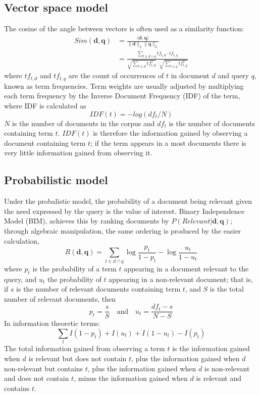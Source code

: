 \subsection{Vector space model}
The cosine of the angle between vectors is often used as a similarity function: 
\begin{align}
Sim(\mathbf{d}, \mathbf{q}) &= \frac{\langle\mathbf{d}, \mathbf{q} \rangle}{\|\mathbf{d}\|_2\|\mathbf{q}\|_2}\\
&= \frac{\sum_{t \in d \cup q} tf_{t, d}\cdot tf_{t, q}}{\sqrt{\sum_{t \in d} tf_{t, d}^2}\cdot\sqrt{\sum_{t \in q} tf_{t, q}^2} }
\end{align}
where $tf_{t, d}$ and $tf_{t, q}$ are the count of occurrences of $t$ in document $d$ and query $q$, known as term frequencies.  Term weights are usually adjusted by multiplying each term frequency by the Inverse Document Frequency (IDF) of the term, where IDF is calculated as 
\begin{equation}
IDF(t) = -log(df_t / N)
\end{equation} 
$N$ is the number of documents in the corpus and $df_t$ is the number of documents containing term $t$.  $IDF(t)$ is therefore the information gained by observing a document containing term $t$; if the term appears in a most documents there is very little information gained from observing it.

\subsection{Probabilistic model}
Under the probalistic model, the probability of a document being relevant given the need expressed by the query is the value of interest\cite{robertson:1997}. Binary Independence Model (BIM), achieves this by ranking documents by $P(Relevant | \mathbf{d}, \mathbf{q})$; through algebraic manipulation, the same ordering is produced by the easier calculation, 
\begin{equation}
R(\mathbf{d}, \mathbf{q}) = \sum_{t \in d \cap q} \log \frac{p_t}{1 - p_t} - \log\frac{u_t}{1 - u_t}
\end{equation}
where $p_t$ is the probability of a term $t$ appearing in a document relevant to the query, and $u_t$ the probability of $t$ appearing in a non-relevant document; that is, if $s$ is the number of relevant documents containing term $t$, and $S$ is the total number of relevant documents, then \begin{equation}
p_t = \frac{s}{S} \quad\text{and}\quad
u_t = \frac{df_t - s}{N - S}
\end{equation}  
In information theoretic terms:
\begin{equation}
\sum_t I(1 - p_t) + I(u_t) + I(1 - u_t) - I(p_t)
\end{equation}
The total information gained from observing a term $t$ is the information gained when $d$ is relevant but does not contain $t$, plus the information gained when $d$ non-relevant but contains $t$, plus the information gained when $d$ is non-relevant and does not contain $t$, minus the information gained when $d$ is relevant and contains $t$. 

